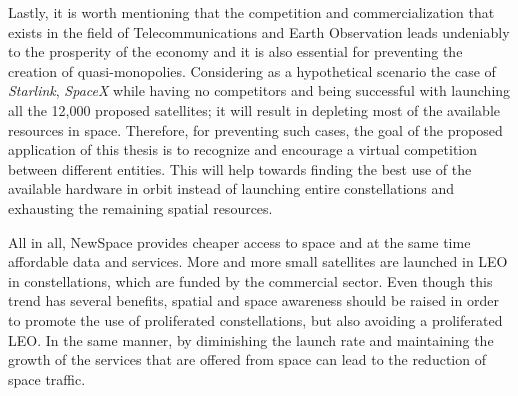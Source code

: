 \begin{center}
\begin{adjustbox}{width=0.9\textwidth}
\begin{tabular}{||c| c |c |c |c||}


\hline
\end{tabular}
\label{table:EO}
\end{adjustbox}
\end{center}
\bigskip

\normalsize

Lastly, it is worth mentioning that the competition and commercialization that exists in the field of Telecommunications and Earth Observation leads undeniably to the prosperity of the economy and it is also essential for preventing the creation of quasi-monopolies. Considering as a hypothetical scenario the case of \textit{Starlink}, \textit{SpaceX} while having no competitors and being successful with launching all the 12,000 proposed satellites; it will result in depleting most of the available resources in space. Therefore, for preventing such cases, the goal of the proposed application of this thesis is to recognize and encourage a virtual competition between different entities. This will help towards finding the best use of the available hardware in orbit instead of launching entire constellations and exhausting the remaining spatial resources.


All in all, NewSpace provides cheaper access to space and at the same time affordable data and services. More and more small satellites are launched in LEO in constellations, which are funded by the commercial sector. Even though this trend has several benefits, spatial and space awareness should be raised in order to promote the use of proliferated constellations, but also avoiding a proliferated LEO. \cite{pLEO} In the same manner, by diminishing the launch rate and maintaining the growth of the services that are offered from space can lead to the reduction of space traffic. %


